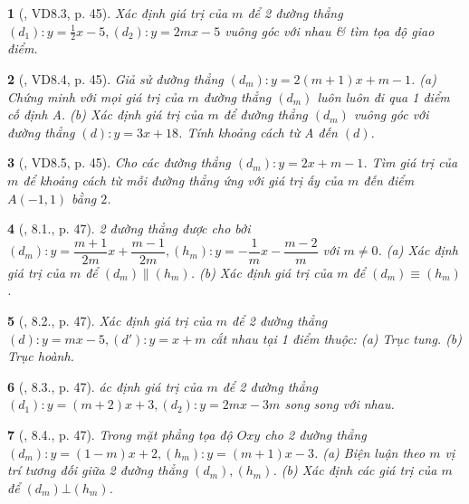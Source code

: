 \documentclass{article}
\newtheorem{baitoan}{}
\begin{document}
\begin{baitoan}[\cite{TLCT_THCS_Toan_9_dai_so}, VD8.3, p. 45]
	Xác định giá trị của $m$ để 2 đường thẳng $(d_1):y = \frac{1}{2}x - 5,(d_2):y = 2mx - 5$ vuông góc với nhau \& tìm tọa độ giao điểm.
\end{baitoan}

\begin{baitoan}[\cite{TLCT_THCS_Toan_9_dai_so}, VD8.4, p. 45]
	Giả sử đường thẳng $(d_m):y = 2(m + 1)x + m - 1$. (a) Chứng minh với mọi giá trị của $m$ đường thẳng $(d_m)$ luôn luôn đi qua 1 điểm cố định A. (b) Xác định giá trị của $m$ để đường thẳng $(d_m)$ vuông góc với đường thẳng $(d):y = 3x + 18$. Tính khoảng cách từ A đến $(d)$.
\end{baitoan}

\begin{baitoan}[\cite{TLCT_THCS_Toan_9_dai_so}, VD8.5, p. 45]
	Cho các đường thẳng $(d_m):y = 2x + m - 1$. Tìm giá trị của $m$ để khoảng cách từ mỗi đường thẳng ứng với giá trị ấy của $m$ đến điểm $A(-1,1)$ bằng $2$.
\end{baitoan}

\begin{baitoan}[\cite{TLCT_THCS_Toan_9_dai_so}, 8.1., p. 47]
	2 đường thẳng được cho bởi $(d_m):y = \dfrac{m + 1}{2m}x + \dfrac{m - 1}{2m},(h_m):y = -\dfrac{1}{m}x - \dfrac{m - 2}{m}$ với $m\ne0$. (a) Xác định giá trị của $m$ để $(d_m)\parallel(h_m)$. (b) Xác định giá trị của $m$ để $(d_m)\equiv(h_m)$.
\end{baitoan}

\begin{baitoan}[\cite{TLCT_THCS_Toan_9_dai_so}, 8.2., p. 47]
	Xác định giá trị của $m$ để 2 đường thẳng $(d):y = mx - 5,(d'):y = x + m$ cắt nhau tại 1 điểm thuộc: (a) Trục tung. (b) Trục hoành.
\end{baitoan}

\begin{baitoan}[\cite{TLCT_THCS_Toan_9_dai_so}, 8.3., p. 47]
	ác định giá trị của $m$ để 2 đường thẳng $(d_1):y = (m + 2)x + 3,(d_2):y = 2mx - 3m$ song song với nhau.
\end{baitoan}

\begin{baitoan}[\cite{TLCT_THCS_Toan_9_dai_so}, 8.4., p. 47]
	Trong mặt phẳng tọa độ $Oxy$ cho 2 đường thẳng $(d_m):y = (1 - m)x + 2,(h_m):y = (m + 1)x - 3$. (a) Biện luận theo $m$ vị trí tương đối giữa 2 đường thẳng $(d_m),(h_m)$. (b) Xác định các giá trị của $m$ để $(d_m)\bot(h_m)$.
\end{baitoan}
\end{document}
